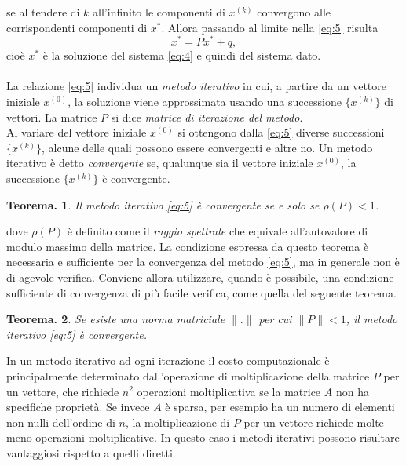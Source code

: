 \documentclass[12pt]{article}
\newtheorem*{remark}{Teorema.}
\begin{document}
se al tendere di \(k\) all'infinito le componenti di \(x^{(k)}\) convergono alle corrispondenti componenti di \(x^*\). Allora passando al limite nella \eqref{eq:5} risulta
\begin{equation}
    x^*=Px^*+q,
\end{equation}
cioè \(x^*\) è la soluzione del sistema \eqref{eq:4} e quindi del sistema dato.
\\\\
La relazione \eqref{eq:5} individua un \textit{metodo iterativo} in cui, a partire da un vettore iniziale \(x^{(0)}\), la soluzione viene approssimata usando una successione \(\{x^{(k)}\}\) di vettori. La matrice \(P\) si dice \textit{matrice di iterazione del metodo}.\\
Al variare del vettore iniziale \(x^{(0)}\) si ottengono dalla \eqref{eq:5} diverse successioni \(\{x^{(k)}\}\), alcune delle quali possono essere convergenti e altre no. Un metodo iterativo è detto \textit{convergente} se, qualunque sia il vettore iniziale \(x^{(0)}\), la successione \(\{x^{(k)}\}\) è convergente.
\begin{remark}
Il metodo iterativo \eqref{eq:5} è convergente se e solo se \(\rho(P)<1\).
\end{remark}
dove \(\rho(P)\) è definito come il \textit{raggio spettrale} che equivale all'autovalore di modulo massimo della matrice. La condizione espressa da questo teorema è necessaria e sufficiente per la convergenza del metodo \eqref{eq:5}, ma in generale non è di agevole verifica. Conviene allora utilizzare, quando è possibile, una condizione sufficiente di convergenza di più facile verifica, come quella del seguente teorema.
\begin{remark}
Se esiste una norma matriciale \(\|.\|\) per cui \(\|P\|<1\), il metodo iterativo \eqref{eq:5} è convergente.
\end{remark}

In un metodo iterativo ad ogni iterazione il costo computazionale è principalmente determinato dall'operazione di moltiplicazione della matrice \(P\) per un vettore, che richiede \(n^2\) operazioni moltiplicativa se la matrice \(A\) non ha specifiche proprietà. Se invece \(A\) è sparsa, per esempio ha un numero di elementi non nulli dell'ordine di \(n\), la moltiplicazione di \(P\) per un vettore richiede molte meno operazioni moltiplicative. In questo caso i metodi iterativi possono risultare vantaggiosi rispetto a quelli diretti.
\end{document}
